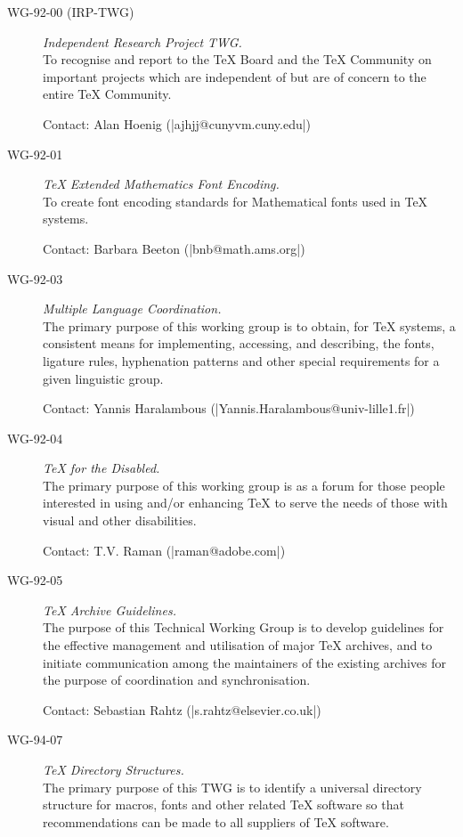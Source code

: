 \begin{description}
\item[WG-92-00 (IRP-TWG)]\emph{Independent Research Project TWG.}\\
To recognise and report to the \TeX{} Board and the \TeX{}
Community on important projects which are independent of  but are
of concern to the entire \TeX{} Community. 

Contact: Alan Hoenig (\Email|ajhjj@cunyvm.cuny.edu|)

\item[WG-92-01]\emph{\TeX{} Extended Mathematics Font Encoding.}\\
To create font encoding standards for Mathematical fonts
used in \TeX{} systems.

Contact: Barbara Beeton (\Email|bnb@math.ams.org|)

\item[WG-92-03]\emph{Multiple Language Coordination.}\\
The primary purpose of this working group is to obtain, for \TeX{}
systems, a consistent means for implementing, accessing, and describing, the
fonts, ligature rules, hyphenation patterns and other special requirements
for a given linguistic group. 

Contact: Yannis Haralambous (\Emaildot|Yannis.Haralambous@univ-lille1.fr|)

\item[WG-92-04]\emph{\TeX{} for the Disabled.}\\
  The primary purpose of this working group is as a forum for those
  people interested in using and/or enhancing \TeX{} to serve the
  needs of those with visual and other disabilities.

Contact: T.V. Raman (\Email|raman@adobe.com|)


\item[WG-92-05]\emph{\TeX{} Archive Guidelines.}\\
The purpose of this Technical Working Group is to develop
guidelines for the effective management and utilisation of major \TeX{}
archives, and to initiate communication among the maintainers of the
existing archives for the purpose of coordination and synchronisation.

Contact: %
Sebastian Rahtz (\Email|s.rahtz@elsevier.co.uk|)

\item[WG-94-07]\emph{\TeX{} Directory Structures.}\\
The primary purpose of this TWG is to identify a universal directory
structure for macros, fonts and other related \TeX{} software so that
recommendations can be made to all suppliers of \TeX{} software.


\end{description}
